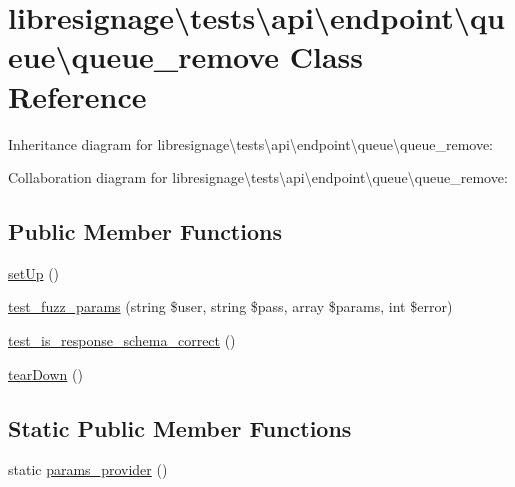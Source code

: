 \hypertarget{classlibresignage_1_1tests_1_1api_1_1endpoint_1_1queue_1_1queue__remove}{}\section{libresignage\textbackslash{}tests\textbackslash{}api\textbackslash{}endpoint\textbackslash{}queue\textbackslash{}queue\+\_\+remove Class Reference}
\label{classlibresignage_1_1tests_1_1api_1_1endpoint_1_1queue_1_1queue__remove}


Inheritance diagram for libresignage\textbackslash{}tests\textbackslash{}api\textbackslash{}endpoint\textbackslash{}queue\textbackslash{}queue\+\_\+remove\+:


Collaboration diagram for libresignage\textbackslash{}tests\textbackslash{}api\textbackslash{}endpoint\textbackslash{}queue\textbackslash{}queue\+\_\+remove\+:
\subsection*{Public Member Functions}
\begin{DoxyCompactItemize}
\item 
\hyperlink{classlibresignage_1_1tests_1_1api_1_1endpoint_1_1queue_1_1queue__remove_aa8691ce873729d25a1c3556388d4ad07}{set\+Up} ()
\item 
\hyperlink{classlibresignage_1_1tests_1_1api_1_1endpoint_1_1queue_1_1queue__remove_af12b7b70e0e8846b5ea8dd7e78d17a81}{test\+\_\+fuzz\+\_\+params} (string \$user, string \$pass, array \$params, int \$error)
\item 
\hyperlink{classlibresignage_1_1tests_1_1api_1_1endpoint_1_1queue_1_1queue__remove_a256f58d90c71da2e8c3c982d8838edc4}{test\+\_\+is\+\_\+response\+\_\+schema\+\_\+correct} ()
\item 
\hyperlink{classlibresignage_1_1tests_1_1api_1_1endpoint_1_1queue_1_1queue__remove_ad052dbdfdc2d67f5b588dbc3d2c853cf}{tear\+Down} ()
\end{DoxyCompactItemize}
\subsection*{Static Public Member Functions}
\begin{DoxyCompactItemize}
\item 
static \hyperlink{classlibresignage_1_1tests_1_1api_1_1endpoint_1_1queue_1_1queue__remove_a01d556e6258d040f1b07aedf42442886}{params\+\_\+provider} ()
\end{DoxyCompactItemize}
